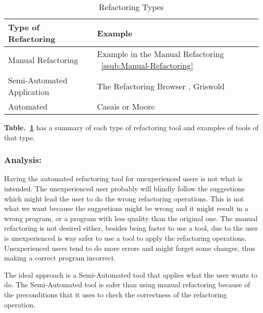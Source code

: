 


\begin{table}[h]
\caption{Refactoring Types}
\label{tab-Refactoring-Types}
\begin{tabular}{|l|l|}
\hline
\textbf{Type of Refactoring} & \textbf{Example}                                                                             \\ \hline
Manual Refactoring           & Example in the Manual Refactoring ~\ref{ssub:Manual-Refactoring}      \\ \hline
Semi-Automated Application   & The Refactoring Browser \cite{roberts1997refactoring}, Griswold \cite{griswold1993automated} \\ \hline
Automated                    & Casais \cite{casais1994automatic} or Moore \cite{moore1996automatic}             \\ \hline
\end{tabular}
\end{table}



{\bf Table.~\ref{tab-Refactoring-Types}} has a summary of each type of refactoring tool and examples of tools of that type.

\subsubsection{Analysis:}
Having the automated refactoring tool for unexperienced users is not what is intended. 
The unexperienced user probably will blindly follow the suggestions which might lead the user to do the wrong refactoring operations.
This is not what we want because the suggestions might be wrong and it might result in a wrong program, or a program with less quality than the original one.
The manual refactoring is not desired either, besides being faster to use a tool, due to the user is unexperienced is way safer to use a tool to apply the refactoring operations. 
Unexperienced users tend to do more errors and might forget some changes, thus making a correct program incorrect.

The ideal approach is a Semi-Automated tool that applies what the user wants to do. 
The Semi-Automated tool is safer than using manual refactoring because of the preconditions that it uses to check the correctness of the refactoring operation.

